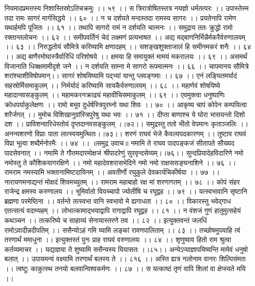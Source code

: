 नियमादप्रमत्तस्य निशास्तिस्रोऽतिचक्रमुः ।। ५९ ।।
स त्रिरात्रोषितस्तत्र नयज्ञो धर्मतत्परः ।।
उपास्तेस्म तदा रामः सागरं मार्गसिद्धये ।। ६० ।।
न च दर्शयते मन्दस्तदा रामस्य सागरः ।।
प्रयतेनापि रामेण यथार्हमपि पूजितः ।। ६१ ।।
तथापि सागरो रामं न दर्शयति चात्मनः ।।
समुद्राय ततः क्रुद्धो रामो रक्तान्तलोचनः ।। ६२ ।।
समीपवर्तिनं चेदं लक्ष्मणं प्रत्यभाषत ।।
अद्य मद्बाणनिर्भिन्नैर्मकरैर्वरुणालयम् ।। ६३ ।।
निरुद्धतोयं सौमित्रे करिष्यामि क्षणादहम् ।।
सशङ्खशुक्ताजालं हि समीनमकरं शनैः ।। ६४ ।।
अद्य बाणैरमोघास्त्रैर्वारिधिं परिशोषये ।।
क्षमया हि समायुक्तं मामयं मकरालयः ।। ६९ ।।
असमर्थं विजानाति धिक्क्षमामीदृशे जने ।।
न दर्शयति साम्ना मे सागरो रूपमात्मनः ।। ६६ ।।
चापमानय सौमित्रे शरांश्चाशीविषोपमान्।।
सागरं शोषयिष्यामि पद्भ्यां यान्तु प्लवङ्गमाः ।। ६७ ।।
एनं लङ्घितमर्यादं सहस्रोर्मिसमाकुलम् ।।
निर्मर्यादं करिष्यामि सायकैर्वरुणालयम् ।। ६८ ।।
महार्णवं शोषयिष्ये महादानवसङ्कुलम् ।।
महामकरनक्राढ्यं महावीचिसमाकुलम् ।। ६९ ।।
एवमुक्त्वा धनुष्पाणिः क्रोधपर्याकुलेक्षणः ।।
रामो बभूव दुर्धर्षस्त्रिपुरघ्नो यथा शिवः ।। ७० ।।
आकृष्य चापं कोपेन कम्पयित्वा शरैर्जगत् ।।
मुमोच विशिखानुग्रांस्त्रिपुरेषु यथा भवः ।। ७१ ।।
दीप्ता बाणाश्च ये घोरा भासयन्तो दिशो दश ।।
प्राविशन्वारिधेस्तोयं दृप्तदानवसङ्कुलम् ।।७२।।
समुद्रस्तु ततो भीतो वेपमानः कृताञ्जलिः ।।
अनन्यशरणो विप्राः पाता लात्स्वयमुत्थितः।।७३।।
शरणं राघवं भेजे कैवल्यपदकारणम् ।।
तुष्टाव राघवं विप्रा भूत्वा शब्दैर्मनोरमैः ।। ७४ ।।
॥समुद्र उवाच॥
नमामि ते राघव पादपङ्कजं सीतापते सौख्यद पादसेवनात् ।।
नमामि ते गौतमदारमोक्षजं श्रीपादरेणुं सुरवृन्दसेव्यम्।।७६।।
सुन्दप्रियादेहविदारिणे नमो नमोस्तु ते कौशिकयागरक्षिणे ।।
नमो महादेवशरासभेदिने नमो नमो राक्षससङ्घनाशिने ।। ७६ ।।
रामराम नमस्यामि भक्तानामिष्टदायिनम् ।।
अवतीर्णो रघुकुले देवकार्यचिकीर्षया ।। ७७ ।।
नारायणमनाद्यन्तं मोक्षदं शिवमच्युतम् ।।
रामराम महाबाहो रक्ष मां शरणागतम् ।। ७८ ।।
कोपं संहर राजेन्द्र क्षमस्व करुणालय ।।
भूमिर्वातो वियच्चापो ज्योतींषि च रघूद्वह ।। ७९ ।।
यत्स्वभावानि सृष्टानि ब्रह्मणा परमेष्ठिना ।।
वर्तन्ते तत्स्वभा वानि स्वभावो मे ह्यगाधता ।। ८० ।।
विकारस्तु भवेद्गाध एतत्सत्यं वदाम्यहम् ।।
लोभात्कामाद्भयाद्वापि रागाद्वापि रघूद्वह ।। ८१ ।।
न वंशजं गुणं हातुमुत्सहेयं कथञ्चन ।।
तत्करिष्ये च साहाय्यं सेनायास्तरणे तव ।। ८२ ।।
इत्युक्तवन्तं जलधिं रामोऽवादीन्नदीपतिम् ।।
ससैन्योऽहं गमि ष्यामि लङ्कां रावणपालिताम् ।। ८३ ।।
तच्छोषमुपयाहि त्वं तरणार्थं ममाधुना ।।
इत्युक्तस्तं पुनः प्राह राघवं वरुणालयः ।। ८४ ।।
शृणुष्वाव हितो राम श्रुत्वा कर्तव्यमाचर ।।
यद्याज्ञया ते शुष्यामि ससैन्यस्य यियासतः ।।८५।।
अन्येऽप्याज्ञापयिष्यन्ति मामेवं धनुषो बलात् ।।
उपायमन्यं वक्ष्यामि तरणार्थं बलस्य ते ।। ८१६ ।।
अस्ति ह्यत्र नलोनाम वानरः शिल्पिसंमतः ।।
त्वष्टुः काकुत्स्थ तनयो बलवान्विश्वकर्मणः ।। ८७ ।।
स यत्काष्ठं तृणं वापि शिलां वा क्षेप्स्यते मयि ।।
